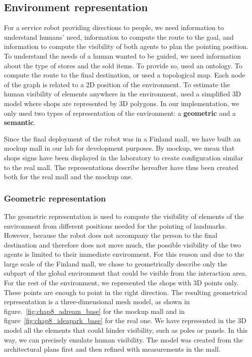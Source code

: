\subsection{Environment representation}

For a service robot providing directions to people, we need information to understand humans' need, information to compute the route to the goal, and information to compute the visibility of both agents to plan the pointing position. To understand the needs of a human wanted to be guided, we need information about the type of stores and the sold items. To provide so, \cite{satake_2015_field, satake_2015_should} used an ontology. To compute the route to the final destination, \cite{matsumoto_2012_you} or \cite{okuno_2009_providing} used a topological map. Each node of the graph is related to a 2D position of the environment. To estimate the human visibility of elements anywhere in the environment, \cite{matsumoto_2012_you} used a simplified 3D model where shops are represented by 3D polygons. In our implementation, we only used two types of representation of the environment: a \textbf{geometric} and a \textbf{semantic}.

Since the final deployment of the robot was in a Finland mall, we have built an mockup mall in our lab for development purposes. By mockup, we mean that shops signs have been displayed in the laboratory to create configuration similar to the real mall. The representations describe hereafter have thus been created both for the real mall and the mockup one.

\subsubsection{Geometric representation}

The geometric representation is used to compute the visibility of elements of the environment from different positions needed for the pointing of landmarks. However, because the robot does not accompany the person to the final destination and therefore does not move much, the possible visibility of the two agents is limited to their immediate environment. For this reason and due to the large scale of the Finland mall, we chose to geometrically describe only the subpart of the global environment that could be visible from the interaction area. For the rest of the environment, we represented the shops with 3D points only. These points are enough to point in the right direction. The resulting geometrical representation is a three-dimensional mesh model, as shown in figure.~\ref{fig:chap8_adream_base} for the mockup mall and in figure~\ref{fig:chap8_ideapark_base} for the real one. We have represented in the 3D model all the elements that could hinder visibility, such as poles or panels. In this way, we can precisely emulate human visibility. The model was created from the architectural plans first and then refined with measurements in the mall.

